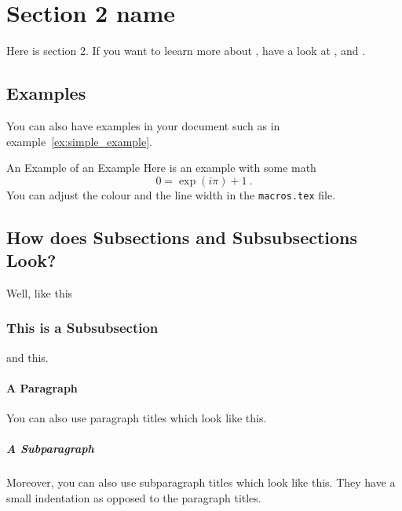 \section{Section 2 name}\label{sec:ch2label}
Here is section 2. If you want to leearn  more about \LaTeXe{}, have a look at \cite{Madsen2010}, \cite{Oetiker2010} and \cite{Mittelbach2005}.

\subsection{Examples}
You can also have examples in your document such as in example~\ref{ex:simple_example}.
\begin{example}{An Example of an Example}
  \label{ex:simple_example}
  Here is an example with some math
  \begin{equation}
    0 = \exp(i\pi)+1\ .
  \end{equation}
  You can adjust the colour and the line width in the {\tt macros.tex} file.
\end{example}

\subsection{How does Subsections and Subsubsections Look?}
Well, like this
\subsubsection{This is a Subsubsection}
and this.

\paragraph{A Paragraph}
You can also use paragraph titles which look like this.

\subparagraph{A Subparagraph} Moreover, you can also use subparagraph titles which look like this. They have a small indentation as opposed to the paragraph titles.


